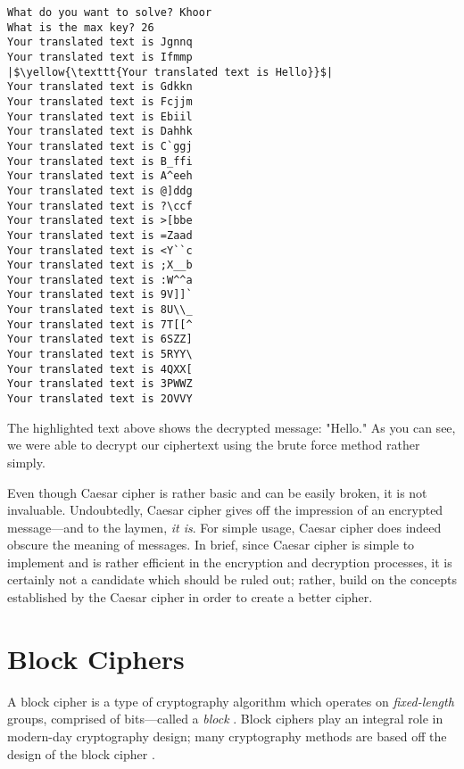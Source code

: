 \begin{verbatim}
What do you want to solve? Khoor
What is the max key? 26
Your translated text is Jgnnq
Your translated text is Ifmmp
|$\yellow{\texttt{Your translated text is Hello}}$|
Your translated text is Gdkkn
Your translated text is Fcjjm
Your translated text is Ebiil
Your translated text is Dahhk
Your translated text is C`ggj
Your translated text is B_ffi
Your translated text is A^eeh
Your translated text is @]ddg
Your translated text is ?\ccf
Your translated text is >[bbe
Your translated text is =Zaad
Your translated text is <Y``c
Your translated text is ;X__b
Your translated text is :W^^a
Your translated text is 9V]]`
Your translated text is 8U\\_
Your translated text is 7T[[^
Your translated text is 6SZZ]
Your translated text is 5RYY\
Your translated text is 4QXX[
Your translated text is 3PWWZ
Your translated text is 2OVVY
\end{verbatim}
\begingroup
\endgroup

The highlighted text above shows the decrypted message: "Hello." As you can see, we were able to decrypt our ciphertext
using the brute force method rather simply. 

Even though Caesar cipher is rather basic and can be easily broken, it is not invaluable. Undoubtedly, Caesar cipher gives
off the impression of an encrypted message---and to the laymen, \textit{it is}. For simple usage, Caesar cipher does indeed
obscure the meaning of messages. In brief, since Caesar cipher is simple to implement and is rather efficient in the
encryption and decryption processes, it is certainly not a candidate which should be ruled out; rather, build on the 
concepts established by the Caesar cipher in order to create a better cipher.

\section{Block Ciphers}

A block cipher is a type of cryptography algorithm which operates on \textit{fixed-length} groups, comprised of bits---called a \textit{block} \cite{wiki:block_cipher}.
Block ciphers play an integral role in modern-day cryptography design; many cryptography methods are based off the design of the block cipher \cite{wiki:block_cipher}.

